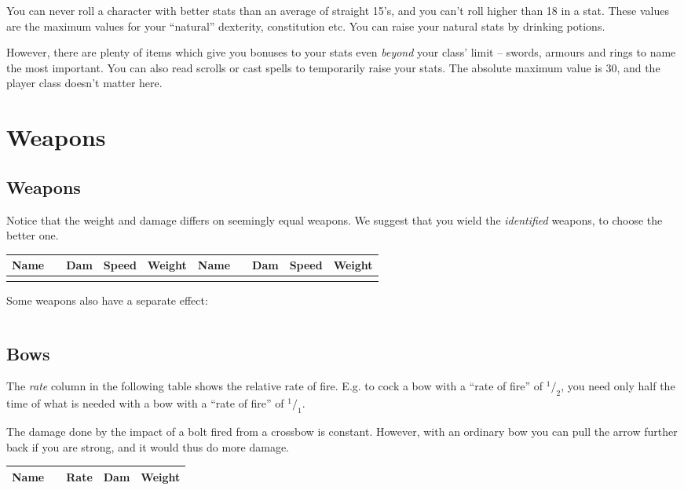 \documentclass[11pt, a4paper]{article}
\begin{document}
You can never roll a character with better stats than an average of
straight 15's, and you can't roll higher than 18 in a stat. These
values are the maximum values for your ``natural'' dexterity,
constitution etc. You can raise your natural stats by drinking
potions.

However, there are plenty of items which give you bonuses to your
stats even {\em beyond} your class' limit -- swords, armours and rings to
name the most important. You can also read scrolls or cast spells to
temporarily raise your stats.  The absolute maximum value is 30, and
the player class doesn't matter here.

\section*{Weapons}

\subsection*{Weapons}
Notice that the weight and damage differs on seemingly equal weapons.
We suggest that you wield the {\em identified} weapons,
to choose the better one.

{\small
\begin{longtable}{|c|c|r|r|r|c|c|r|r|r|}
\hline
Name&&Dam&Speed&Weight&Name&&Dam&Speed&Weight\\
\hline
\hline
\endhead
\hline
\endfoot

\end{longtable}
}

Some weapons also have a separate effect:

{\small
\begin{tabular}{l c p{10cm}}

\end{tabular}
}
\subsection*{Bows}

The {\em rate} column in the following table shows the relative rate
of fire. E.g. to cock a bow with a ``rate of fire'' of $^1/_2$, you
need only half the time of what is needed with a bow with a ``rate of
fire'' of $^1/_1$.

The damage done by the impact of a bolt fired from a crossbow is
constant.  However, with an ordinary bow you can pull the arrow
further back if you are strong, and it would thus do more damage.

{\small
\begin{center}
\begin{tabular} {|c|c|r|r|r|}
\hline
Name&&Rate&Dam&Weight\\
\hline
\hline

\hline
\end{tabular}
\end{center}
}
\end{document}
